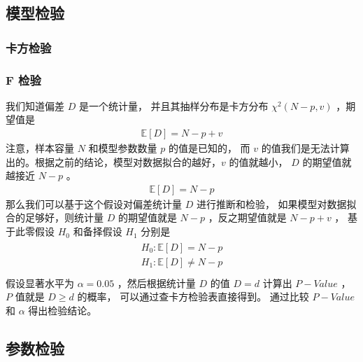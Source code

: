 \documentclass[letterpaper,10pt,english]{sphinxmanual}
\begin{document}
\subsection{模型检验}
\label{\detokenize{_u6a21_u578b_u8bc4_u4f30/influence:id7}}

\subsubsection{卡方检验}
\label{\detokenize{_u6a21_u578b_u8bc4_u4f30/influence:id8}}

\subsubsection{F 检验}
\label{\detokenize{_u6a21_u578b_u8bc4_u4f30/influence:f}}
我们知道偏差 \(D\) 是一个统计量，
并且其抽样分布是卡方分布 \(\chi^2(N-p,v)\) ，期望值是
\begin{equation}\label{equation:模型评估/influence:模型评估/influence:37}
\begin{split}\mathbb{E}[D] = N-p+v\end{split}
\end{equation}
注意，样本容量 \(N\) 和模型参数数量 \(p\) 的值是已知的，
而 \(v\) 的值我们是无法计算出的。根据之前的结论，模型对数据拟合的越好，\(v\) 的值就越小，
\(D\) 的期望值就越接近 \(N-p\) 。
\begin{equation}\label{equation:模型评估/influence:模型评估/influence:38}
\begin{split}\mathbb{E}[D] = N-p\end{split}
\end{equation}
那么我们可以基于这个假设对偏差统计量 \(D\) 进行推断和检验，
如果模型对数据拟合的足够好，则统计量 \(D\) 的期望值就是
\(N-p\) ，反之期望值就是 \(N-p+v\) ，
基于此零假设 \(H_0\) 和备择假设 \(H_1\)
分别是
\begin{align}\label{equation:模型评估/influence:模型评估/influence:39}\!\begin{aligned}
H_0 : \mathbb{E}[D] = N-p\\
H_1 : \mathbb{E}[D] \ne N-p\\
\end{aligned}\end{align}
假设显著水平为 \(\alpha =0.05\)
，然后根据统计量 \(D\) 的值 \(D=d\)
计算出 \(P-Value\) ，
\(P\) 值就是 \(D\ge d\) 的概率，
可以通过查卡方检验表直接得到。
通过比较 \(P-Value\) 和 \(\alpha\)
得出检验结论。


\subsection{参数检验}
\label{\detokenize{_u6a21_u578b_u8bc4_u4f30/influence:id9}}
\end{document}
